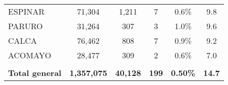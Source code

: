 \begin{tabular}{lccccc}
	\cellcolor[HTML]{FFFF99}ESPINAR                                 & 71,304               & 1,211                                & 7                    & 0.6\%                      & 9.8                                         \\
	\cellcolor[HTML]{FFFF99}PARURO                                  & 31,264               & 307                                  & 3                    & 1.0\%                      & 9.6                                         \\
	\cellcolor[HTML]{FFFF99}CALCA                                   & 76,462               & 808                                  & 7                    & 0.9\%                      & 9.2                                         \\
	\cellcolor[HTML]{FFFF99}ACOMAYO                                 & 28,477               & 309                                  & 2                    & 0.6\%                      & 7.0                                         \\
	& \multicolumn{1}{l}{} & \multicolumn{1}{l}{}                 & \multicolumn{1}{l}{} & \multicolumn{1}{l}{}       & \multicolumn{1}{l}{}                        \\
	\rowcolor[HTML]{DDEBF7} 
	\textbf{Total general}                                          & \textbf{1,357,075}   & \textbf{40,128}                      & \textbf{199}         & \textbf{0.50\%}            & \textbf{14.7}                              
\end{tabular}